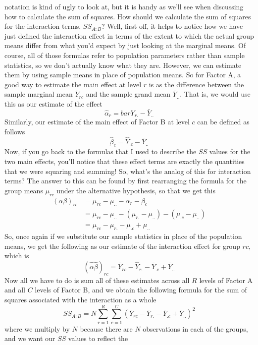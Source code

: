 \documentclass[
  a4paper,
]{book}
\begin{document}
{  notation is kind of ugly to look at, but it is handy as we'll see when
  discussing how to calculate the sum of squares. How should we
  calculate the sum of squares for the interaction terms, \(SS_{A:B}\)?
  Well, first off, it helps to notice how we have just defined the
  interaction effect in terms of the extent to which the actual group
  means differ from what you'd expect by just looking at the marginal
  means. Of course, all of those formulas refer to population parameters
  rather than sample statistics, so we don't actually know what they
  are. However, we can estimate them by using sample means in place of
  population means. So for Factor A, a good way to estimate the main
  effect at level \(r\) is as the difference between the sample marginal
  mean \(\bar{Y}_{rc}\) and the sample grand mean \(\bar{Y}_{..}\). That
  is, we would use this as our estimate of the effect
  \[\hat{\alpha}_r = bar{Y}_{r.}-\bar{Y}_{..}\] Similarly, our estimate
  of the main effect of Factor B at level \(c\) can be defined as
  follows \[\hat{\beta}_{c}=\hat{Y}_{.c}-\bar{Y}_{..}\] Now, if you go
  back to the formulas that I used to describe the \(SS\) values for the
  two main effects, you'll notice that these effect terms are exactly
  the quantities that we were squaring and summing! So, what's the
  analog of this for interaction terms? The answer to this can be found
  by first rearranging the formula for the group means \(\mu_{rc}\)
  under the alternative hypothesis, so that we get this
  \[\begin{aligned} (\alpha \beta)_{rc} & = \mu_{rc} - \mu_{..} - \alpha_r - \beta_c \\ & = \mu_{rc} - \mu_{..} - (\mu_{r.}-\mu_{..})-(\mu_{.c}-\mu_{..}) \\ & = \mu_{rc} - \mu_{r.} - \mu_{.c} +\mu_{..} \end{aligned}\]
  So, once again if we substitute our sample statistics in place of the
  population means, we get the following as our estimate of the
  interaction effect for group \(rc\), which is
  \[(\hat{\alpha \beta})_{rc}=\bar{Y}_{rc}-\hat{Y}_{r.}-\bar{Y}_{.c}+\bar{Y}_{..}\]
  Now all we have to do is sum all of these estimates across all \(R\)
  levels of Factor A and all \(C\) levels of Factor B, and we obtain the
  following formula for the sum of squares associated with the
  interaction as a whole
  \[SS_{A:B}=N \sum_{r=1}^R \sum_{c=1}^C (\bar{Y}_{rc}-\bar{Y}_{r.}-\bar{Y}_{.c}+\bar{Y}_{..})^2\]
  where we multiply by \(N\) because there are \(N\) observations in
  each of the groups, and we want our \(SS\) values to reflect the
}
\end{document}
